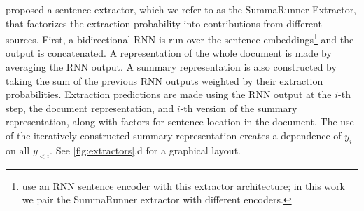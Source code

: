 
\citet{nallapati2017summarunner} proposed
a sentence extractor, which we refer to as the SummaRunner Extractor,
that factorizes the extraction probability into contributions 
from different sources.
First, a bidirectional RNN is run over the sentence embeddings\footnote{\citet{nallapati2017summarunner}
    use an RNN sentence encoder with 
this extractor architecture; in this work we pair the SummaRunner extractor
with different encoders. } and the output is
concatenated. A representation of the whole document is made by 
averaging the RNN output. A summary representation is also constructed 
by taking the sum of the previous RNN outputs weighted by their extraction
probabilities. Extraction predictions are made using 
the RNN output at the $i$-th step, the document representation, and 
$i$-th version of the summary representation, along with factors for 
sentence location in the document. The use of the iteratively constructed
summary representation creates a dependence of $y_i$ on all $y_{<i}$.
See \autoref{fig:extractors}.d for a graphical layout.



